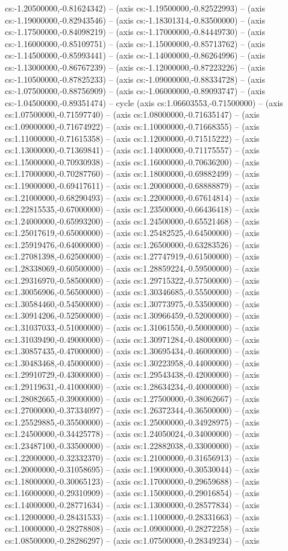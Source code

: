 cs:-1.20500000,-0.81624342) -- (axis cs:-1.19500000,-0.82522993) -- (axis cs:-1.19000000,-0.82943546) -- (axis cs:-1.18301314,-0.83500000) -- (axis cs:-1.17500000,-0.84098219) -- (axis cs:-1.17000000,-0.84449730) -- (axis cs:-1.16000000,-0.85109751) -- (axis cs:-1.15000000,-0.85713762) -- (axis cs:-1.14500000,-0.85993441) -- (axis cs:-1.14000000,-0.86264996) -- (axis cs:-1.13000000,-0.86767239) -- (axis cs:-1.12000000,-0.87223226) -- (axis cs:-1.10500000,-0.87825233) -- (axis cs:-1.09000000,-0.88334728) -- (axis cs:-1.07500000,-0.88756909) -- (axis cs:-1.06000000,-0.89093747) -- (axis cs:-1.04500000,-0.89351474) -- cycle (axis cs:1.06603553,-0.71500000) -- (axis cs:1.07500000,-0.71597740) -- (axis cs:1.08000000,-0.71635147) -- (axis cs:1.09000000,-0.71674922) -- (axis cs:1.10000000,-0.71668355) -- (axis cs:1.11000000,-0.71615358) -- (axis cs:1.12000000,-0.71515222) -- (axis cs:1.13000000,-0.71369841) -- (axis cs:1.14000000,-0.71175557) -- (axis cs:1.15000000,-0.70930938) -- (axis cs:1.16000000,-0.70636200) -- (axis cs:1.17000000,-0.70287760) -- (axis cs:1.18000000,-0.69882499) -- (axis cs:1.19000000,-0.69417611) -- (axis cs:1.20000000,-0.68888879) -- (axis cs:1.21000000,-0.68290493) -- (axis cs:1.22000000,-0.67614814) -- (axis cs:1.22815535,-0.67000000) -- (axis cs:1.23500000,-0.66436418) -- (axis cs:1.24000000,-0.65993200) -- (axis cs:1.24500000,-0.65521468) -- (axis cs:1.25017619,-0.65000000) -- (axis cs:1.25482525,-0.64500000) -- (axis cs:1.25919476,-0.64000000) -- (axis cs:1.26500000,-0.63283526) -- (axis cs:1.27081398,-0.62500000) -- (axis cs:1.27747919,-0.61500000) -- (axis cs:1.28338069,-0.60500000) -- (axis cs:1.28859224,-0.59500000) -- (axis cs:1.29316970,-0.58500000) -- (axis cs:1.29715322,-0.57500000) -- (axis cs:1.30056906,-0.56500000) -- (axis cs:1.30346685,-0.55500000) -- (axis cs:1.30584460,-0.54500000) -- (axis cs:1.30773975,-0.53500000) -- (axis cs:1.30914206,-0.52500000) -- (axis cs:1.30966459,-0.52000000) -- (axis cs:1.31037033,-0.51000000) -- (axis cs:1.31061550,-0.50000000) -- (axis cs:1.31039490,-0.49000000) -- (axis cs:1.30971284,-0.48000000) -- (axis cs:1.30857435,-0.47000000) -- (axis cs:1.30695434,-0.46000000) -- (axis cs:1.30483468,-0.45000000) -- (axis cs:1.30223958,-0.44000000) -- (axis cs:1.29910729,-0.43000000) -- (axis cs:1.29543438,-0.42000000) -- (axis cs:1.29119631,-0.41000000) -- (axis cs:1.28634234,-0.40000000) -- (axis cs:1.28082665,-0.39000000) -- (axis cs:1.27500000,-0.38062667) -- (axis cs:1.27000000,-0.37334097) -- (axis cs:1.26372344,-0.36500000) -- (axis cs:1.25529885,-0.35500000) -- (axis cs:1.25000000,-0.34928975) -- (axis cs:1.24500000,-0.34425778) -- (axis cs:1.24050024,-0.34000000) -- (axis cs:1.23487100,-0.33500000) -- (axis cs:1.22882038,-0.33000000) -- (axis cs:1.22000000,-0.32332370) -- (axis cs:1.21000000,-0.31656913) -- (axis cs:1.20000000,-0.31058695) -- (axis cs:1.19000000,-0.30530044) -- (axis cs:1.18000000,-0.30065123) -- (axis cs:1.17000000,-0.29659688) -- (axis cs:1.16000000,-0.29310909) -- (axis cs:1.15000000,-0.29016854) -- (axis cs:1.14000000,-0.28771634) -- (axis cs:1.13000000,-0.28577834) -- (axis cs:1.12000000,-0.28431533) -- (axis cs:1.11000000,-0.28331663) -- (axis cs:1.10000000,-0.28278808) -- (axis cs:1.09000000,-0.28272258) -- (axis cs:1.08500000,-0.28286297) -- (axis cs:1.07500000,-0.28349234) -- (axis 